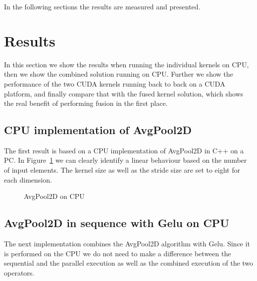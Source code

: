 \documentclass[letterpaper]{article}
\begin{document}
In the following sections the results are measured and presented. 

\section{Results}

In this section we show the results when running the individual kernels on CPU, then we show the combined solution running on CPU. Further we show the performance of the two CUDA kernels running back to back on a CUDA platform, and finally compare that with the fused kernel solution, which shows the real benefit of performing fusion in the first place. 

\subsection{CPU implementation of AvgPool2D}

The first result is based on a CPU implementation of AvgPool2D in C++ on a PC. In Figure~\ref{cpuAvgPool} we can clearly identify a linear behaviour based on the number of input elements. The kernel size as well as the stride size are set to eight for each dimension.  

\begin{figure}
\caption{AvgPool2D on CPU}
\label{cpuAvgPool}
\end{figure}

\subsection{AvgPool2D in sequence with Gelu on CPU}

The next implementation combines the AvgPool2D algorithm with Gelu. Since it is performed on the CPU we do not need to make a difference between the sequential and the parallel execution as well as the combined execution of the two operators. 
\end{document}
